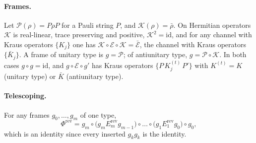 \paragraph{Frames.}
Let $\mathcal P(\rho)=P\rho P$ for a Pauli string $P$, and $\mathcal K(\rho)=\bar\rho$. On Hermitian
operators $\mathcal K$ is real-linear, trace preserving and positive, $\mathcal K^2=\mathrm{id}$,
and for any channel with Kraus operators $\{K_j\}$ one has
$\mathcal K\circ\mathcal E\circ\mathcal K=\bar{\mathcal E}$, the channel with Kraus operators
$\{\bar K_j\}$. A frame of unitary type is $g=\mathcal P$; of antiunitary type,
$g=\mathcal P\circ\mathcal K$. In both cases $g\circ g=\mathrm{id}$, and
$g\circ\mathcal E\circ g'$ has Kraus operators $\{P\,K_j^{(t)}\,P'\}$ with
$K^{(t)}=K$ (unitary type) or $\bar K$ (antiunitary type).

\paragraph{Telescoping.}
For any frames $g_0,\dots,g_m$ of one type,
\begin{equation}
\Phi^{\mathrm{rev}}=g_m\circ\big(g_m E^{\mathrm{rev}}_m g_{m-1}\big)\circ\dots\circ
\big(g_1 E^{\mathrm{rev}}_1 g_0\big)\circ g_0 ,
\label{eq:telescope}
\end{equation}
which is an identity since every inserted $g_k g_k$ is the identity.

